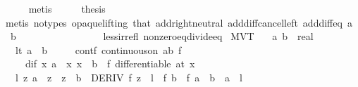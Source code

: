 \begin{isabellebody}
\ \ \ \ \isamarkupfalse%
\ metis\isanewline
\ \ \isamarkupfalse%
\ \isamarkupfalse%
\ {\isacharquery}{\kern0pt}thesis\isanewline
\ \ \ \ \isamarkupfalse%
\ {\isacharparenleft}{\kern0pt}metis\ {\isacharparenleft}{\kern0pt}no{\isacharunderscore}{\kern0pt}types{\isacharcomma}{\kern0pt}\ opaque{\isacharunderscore}{\kern0pt}lifting{\isacharparenright}{\kern0pt}\ that\ add{\isachardot}{\kern0pt}right{\isacharunderscore}{\kern0pt}neutral\ add{\isacharunderscore}{\kern0pt}diff{\isacharunderscore}{\kern0pt}cancel{\isacharunderscore}{\kern0pt}left{\isacharprime}{\kern0pt}\ add{\isacharunderscore}{\kern0pt}diff{\isacharunderscore}{\kern0pt}eq\ {\isacartoucheopen}a\ {\isacharless}{\kern0pt}\ b{\isacartoucheclose}\isanewline
\ \ \ \ \ \ \ \ \ \ \ \ \ \ \ \ \ less{\isacharunderscore}{\kern0pt}irrefl\ nonzero{\isacharunderscore}{\kern0pt}eq{\isacharunderscore}{\kern0pt}divide{\isacharunderscore}{\kern0pt}eq{\isacharparenright}{\kern0pt}\isanewline
{}\isamarkupfalse%
%
\endisatagproof
{\isafoldproof}%
%
\isadelimproof
\isanewline
%
\endisadelimproof
\isanewline
{}\isamarkupfalse%
\ MVT{\isacharcolon}{\kern0pt}\isanewline
\ \ \ a\ b\ {\isacharcolon}{\kern0pt}{\isacharcolon}{\kern0pt}\ real\isanewline
\ \ \ lt{\isacharcolon}{\kern0pt}\ {\isachardoublequoteopen}a\ {\isacharless}{\kern0pt}\ b{\isachardoublequoteclose}\isanewline
\ \ \ \ \ contf{\isacharcolon}{\kern0pt}\ {\isachardoublequoteopen}continuous{\isacharunderscore}{\kern0pt}on\ {\isacharbraceleft}{\kern0pt}a{\isachardot}{\kern0pt}{\isachardot}{\kern0pt}b{\isacharbraceright}{\kern0pt}\ f{\isachardoublequoteclose}\isanewline
\ \ \ \ \ dif{\isacharcolon}{\kern0pt}\ {\isachardoublequoteopen}{\isasymAnd}x{\isachardot}{\kern0pt}\ {\isasymlbrakk}a\ {\isacharless}{\kern0pt}\ x{\isacharsemicolon}{\kern0pt}\ x\ {\isacharless}{\kern0pt}\ b{\isasymrbrakk}\ {\isasymLongrightarrow}\ f\ differentiable\ {\isacharparenleft}{\kern0pt}at\ x{\isacharparenright}{\kern0pt}{\isachardoublequoteclose}\isanewline
\ \ \ {\isachardoublequoteopen}{\isasymexists}l\ z{\isachardot}{\kern0pt}\ a\ {\isacharless}{\kern0pt}\ z\ {\isasymand}\ z\ {\isacharless}{\kern0pt}\ b\ {\isasymand}\ DERIV\ f\ z\ {\isacharcolon}{\kern0pt}{\isachargreater}{\kern0pt}\ l\ {\isasymand}\ f\ b\ {\isacharminus}{\kern0pt}\ f\ a\ {\isacharequal}{\kern0pt}\ {\isacharparenleft}{\kern0pt}b\ {\isacharminus}{\kern0pt}\ a{\isacharparenright}{\kern0pt}\ {\isacharasterisk}{\kern0pt}\ l{\isachardoublequoteclose}\isanewline

\end{isabellebody}
